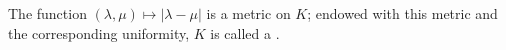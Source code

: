The function $(\lambda, \mu) \mapsto |\lambda - \mu|$ is a metric on $K$; endowed with this metric and the corresponding uniformity, $K$ is called a .
